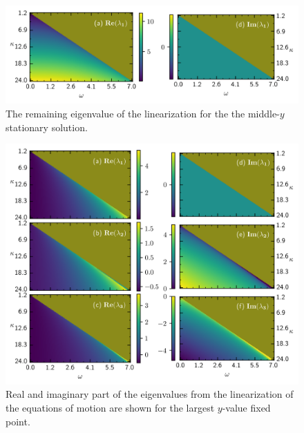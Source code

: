 \begin{appendices}
    \begin{figure}[H]
        \centering
        \includegraphics{pictures/lam_anal_m2.png}
        \caption{The remaining eigenvalue of the linearization for the the middle-$y$ stationary solution.
        }
    \end{figure}
    \begin{figure}[H]
        \centering
        \includegraphics{pictures/lam_anal_l.png}
        \caption{Real and imaginary part of the eigenvalues from the linearization of the equations of motion are shown for the largest $y$-value fixed point.
        }
    \end{figure}
    
    

\end{appendices}
